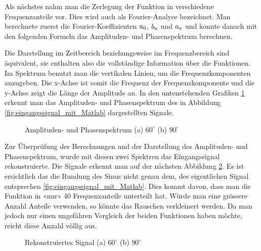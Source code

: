 Als nächstes nahm man die Zerlegung der Funktion in verschiedene Frequenzanteile vor. Dies wird auch als Fourier-Analyse bezeichnet. Man berechnete zuerst die Fourier-Koeffizienten $a\textsubscript{0}$, $b\textsubscript{n}$ und $a\textsubscript{n}$ und konnte danach mit den folgenden Formeln das Amplituden- und Phasenspektrum berechnen.



 Die Darstellung im Zeitbereich beziehungsweise im Frequenzbereich sind äquivalent, sie enthalten also die vollständige Information über die Funktionen. Im Spektrum benutzt man die vertikalen Linien, um die Frequenzkomponenten anzugeben. Die x-Achse ist somit die Frequenz der Frequenzkomponente und die y-Achse zeigt die Länge der Amplitude an. In den untenstehenden Grafiken \ref{fig:Amplituden- und Phasenspektrum} erkennt man das Amplituden- und Phasenspektrum des in Abbildung \ref{fig:eingangssignal_mit_Matlab} dargestellten Signale.

\begin{figure}[h]
	\centering
	\qquad
	\caption{Amplituden- und Phasenspektrum (a) $60^\circ$ (b) $90^\circ$}
	\label{fig:Amplituden- und Phasenspektrum}
\end{figure} 

Zur Überprüfung der Berechnungen und der Darstellung des Amplituden- und Phasenspektrum, wurde mit diesen zwei Spektren das Eingangssignal rekonstruierte. Die Signale erkennt man auf der nächsten Abbildung \ref{fig:Rekonstruiertes Signal}. Es ist ersichtlich das die Rundung des Sinus nicht genau dem, des eigentlichen Signal entsprechen \ref{fig:eingangssignal_mit_Matlab}. Dies kommt davon, dass man die Funktion in «nur» 40 Frequenzanteile unterteilt hat. Würde man eine grössere Anzahl Anteile verwenden, so könnte das Rauschen verkleinert werden. Da man jedoch nur einen ungefähren Vergleich der beiden Funktionen haben möchte, reicht diese Anzahl völlig aus. 

\begin{figure}[h]
	\centering
	\qquad
	\caption{Rekonstruiertes Signal (a) $60^\circ$ (b) $90^\circ$}
	\label{fig:Rekonstruiertes Signal}
\end{figure} 


